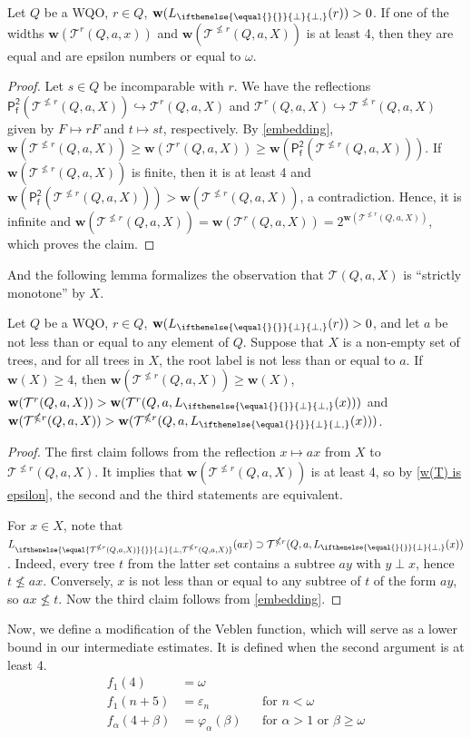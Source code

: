 \documentclass[runningheads]{llncs}
\let \nleq \nleqslant
\let \geq \geqslant
\let \phi \varphi
\let \epsilon \varepsilon
\let \embeds \hookrightarrow
\newcommand \K [2][]{L_{\ifthenelse{\equal{#1}{}}{\bot}{\bot,#1}}(#2)}
\renewcommand \k [2][]{\w(\K[#1]{#2})}
\renewcommand \S [1][]{\mathsf{P_f^{#1}}}
\def \T {\mathcal{T}}
\def \w {\textbf{w}}
\begin{document}
\begin{lemma}\label{w(T) is epsilon}
    Let $Q$ be a WQO, $r \in Q$, $\k{r} > 0$. If one of the widths $\w(\T^r(Q, a, x))$ and $\w(\T^{\nleq r}(Q, a, X))$ is at least 4, then they are equal and are epsilon numbers or equal to $\omega$.
\end{lemma}
\begin{proof}
    Let $s \in Q$ be incomparable with $r$. We have the reflections $\S[2](\T^{\nleq r}(Q, a, X)) \embeds \T^r(Q, a, X)$ and $\T^r(Q, a, X) \embeds \T^{\nleq r}(Q, a, X)$ given by $F \mapsto rF$ and $t \mapsto st$, respectively. By \cref{embedding}, $\w(\T^{\nleq r}(Q, a, X)) \geq \w(\T^r(Q, a, X)) \geq \w(\S[2](\T^{\nleq r}(Q, a, X)))$. If $\w(\T^{\nleq r}(Q, a, X))$ is finite, then it is at least 4 and $\w(\S[2](\T^{\nleq r}(Q, a, X))) > \w(\T^{\nleq r}(Q, a, X))$, a contradiction. Hence, it is infinite and $\w(\T^{\nleq r}(Q, a, X)) = \w(\T^r(Q, a, X)) =2^{\w(\T^{\nleq r}(Q, a, X))}$, which proves the claim.
\end{proof}

And the following lemma formalizes the observation that $\T(Q, a, X)$ is ``strictly monotone'' by $X$.

\begin{lemma}\label{w(T) is monotone by X}
    Let $Q$ be a WQO, $r \in Q$, $\k{r} > 0$, and let $a$ be not less than or equal to any element of $Q$.
    Suppose that $X$ is a non-empty set of trees, and for all trees in $X$, the root label is not less than or equal to $a$.
    If $\w(X) \geq 4$, then $\w(\T^{\nleq r}(Q, a, X)) \geq \w(X)$, $\w(\T^r(Q, a, X)) > \w(\T^r(Q, a, \K{x}))$ and $\w(\T^{\nleq r}(Q, a, X)) > \w(\T^{\nleq r}(Q, a, \K{x}))$.
\end{lemma}
\begin{proof}
    The first claim follows from the reflection $x \mapsto ax$ from $X$ to $\T^{\nleq r}(Q, a, X)$.
    It implies that $\w(\T^{\nleq r}(Q, a, X))$ is at least 4, so by \cref{w(T) is epsilon}, the second and the third statements are equivalent.
    
    For $x \in X$, note that $\K[\T^{\nleq r}(Q, a, X)]{a x} \supset \T^{\nleq r}(Q, a, \K{x})$. Indeed, every tree $t$ from the latter set contains a subtree $a y$ with $y \perp x$, hence $t \nleq a x$. Conversely, $x$ is not less than or equal to any subtree of $t$ of the form $a y$, so $a x \nleq t$. Now the third claim follows from \cref{embedding}.
\end{proof}

Now, we define a modification of the Veblen function, which will serve as a lower bound in our intermediate estimates. It is defined when the second argument is at least 4.
\begin{align*}
    f_1(4) &= \omega\\
    f_1(n+5) &= \epsilon_n &&\text{for } n < \omega\\
    f_\alpha(4+\beta) &= \phi_\alpha(\beta) &&\text{for } \alpha > 1 \text{ or } \beta \geq \omega
\end{align*}
\end{document}
